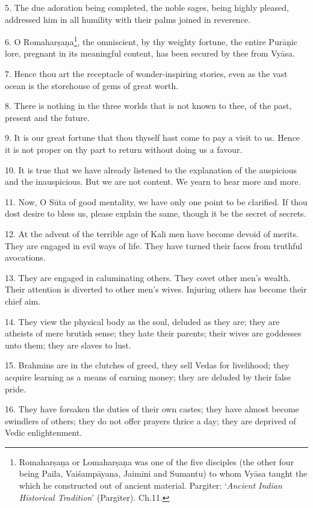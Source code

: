 5. The due adoration being completed, the noble sages, being highly pleased,
addressed him in all humility with their palms joined in reverence.

6. O Romaharṣaṇa\footnote{Romaharṣaṇa or Lomaharṣaṇa was one of the five
disciples (the other four being Paila, Vaiśampāyana, Jaimini and Sumantu) to
whom Vyāsa taught the  which he constructed out of ancient material.
Pargiter: ‘\emph{Ancient Indian Historical Tradition}’ (Pargiter). Ch.11.},
the omniscient, by thy weighty fortune, the entire Purāṇic lore, pregnant in its
meaningful content, has been secured by thee from Vyāsa.

7. Hence thou art the receptacle of wonder-inspiring stories, even as the vast
ocean is the storehouse of gems of great worth.

8. There is nothing in the three worlds that is not known to thee, of the past,
present and the future.

9. It is our great fortune that thou thyself hast come to pay a visit to us.
Hence it is not proper on thy part to return without doing us a favour.

10. It is true that we have already listened to the explanation of the auspicious
and the inauspicious. But we are not content. We yearn to hear more and more.

11. Now, O Sūta of good mentality, we have only one point to be clarified. If
thou dost desire to bless us, please explain the same, though it be the secret
of secrets.

12. At the advent of the terrible age of Kali men have become devoid of merits.
They are engaged in evil ways of life. They have turned their faces from
truthful avocations.

13. They are engaged in caluminating others. They covet other men’s wealth.
Their attention is diverted to other men’s wives. Injuring others has become
their chief aim.

14. They view the physical body as the soul, deluded as they are; they are
atheists of mere brutish sense; they hate their parents; their wives are
goddesses unto them; they are slaves to lust.

15. Brahmins are in the clutches of greed, they sell Vedas for livelihood; they
acquire learning as a means of earning money; they are deluded by their false
pride.

16. They have forsaken the duties of their own castes; they have almost become
swindlers of others; they do not offer  prayers thrice a day; they
are deprived of Vedic enlightenment.

